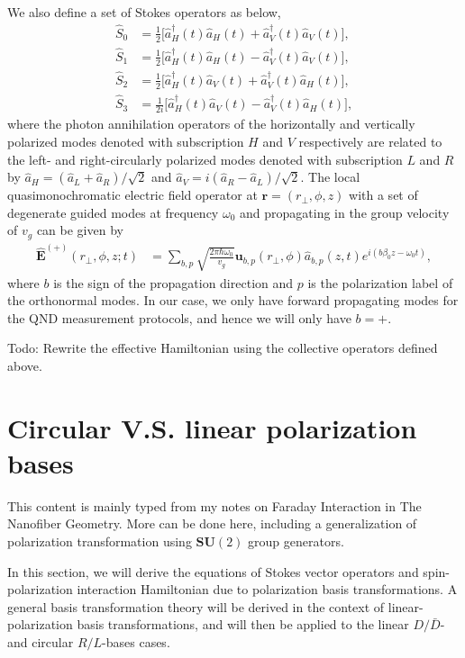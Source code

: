 \documentclass[preprint,aps,pra,onecolumn,superscriptaddress]{revtex4-1} %
\def\br{\mathbf{r}}
\newcommand{\smallfrac}[2]{\mbox{$\frac{#1}{#2}$}}
\newcommand{\comment}[1]{{\color{Maroon} #1}}
\begin{document}
\begin{appendix}
We also define a set of Stokes operators as below,
\begin{align}
\hat{S}_0 &= \smallfrac{1}{2}\big[ \hat{a}^\dag_H(t) \hat{a}_H(t)+\hat{a}^\dag_V(t) \hat{a}_V(t) \big],\\
\hat{S}_1 &= \smallfrac{1}{2}\big[ \hat{a}^\dag_H(t) \hat{a}_H(t)-\hat{a}^\dag_V(t) \hat{a}_V(t) \big],\\
\hat{S}_2 &= \smallfrac{1}{2}\big[ \hat{a}^\dag_H(t) \hat{a}_V(t)+\hat{a}^\dag_V(t) \hat{a}_H(t) \big],\\
\hat{S}_3 &= \smallfrac{1}{2i}\big[ \hat{a}^\dag_H(t) \hat{a}_V(t) -\hat{a}^\dag_V(t) \hat{a}_H(t) \big],
\end{align}
where the photon annihilation operators of the horizontally and vertically polarized modes denoted with subscription $ H $ and $ V $ respectively are related to the left- and right-circularly polarized modes denoted with subscription $ L $ and $ R $ by $ \hat{a}_{H}=(\hat{a}_L+\hat{a}_R) /\sqrt{2}$ and $ \hat{a}_{V}=i(\hat{a}_R-\hat{a}_L)/\sqrt{2} $.
The local quasimonochromatic electric field operator at $\br= (r\!_\perp,\phi,z) $ with a set of degenerate guided modes at frequency $ \omega_0 $ and propagating in the group velocity of $ v_g $ can be given by
\begin{align}\label{eq:Ebp}
\hat{\mathbf{E}}^{(+)}(r\!_\perp,\phi,z;t) &= \sum_{b,p} \sqrt{ \frac{2 \pi \hbar \omega_0}{ v_g} } \mathbf{u}_{b,p}(r\!_\perp,\phi) \hat{a}_{b,p}(z,t)  e^{i (b\beta_0 z- \omega_0 t)},
\end{align}
where $ b $ is the sign of the propagation direction and $ p $ is the polarization label of the orthonormal modes.
In our case, we only have forward propagating modes for the QND measurement protocols, and hence we will only have $ b=+ $.

\comment{Todo: Rewrite the effective Hamiltonian using the collective operators defined above.}

\section{Circular V.S. linear polarization bases}\label{Appendix:LRbases}
\comment{This content is mainly typed from my notes on Faraday Interaction in The Nanofiber Geometry. More can be done here, including a generalization of polarization transformation using $ \mathbf{SU}(2) $ group generators.}

In this section, we will derive the equations of Stokes vector operators and spin-polarization interaction Hamiltonian due to polarization basis transformations.
A general basis transformation theory will be derived in the context of linear-polarization basis transformations, and will then be applied to the linear $ D/\bar{D} $- and circular $ R/L $-bases cases.


\end{appendix}
\end{document}
